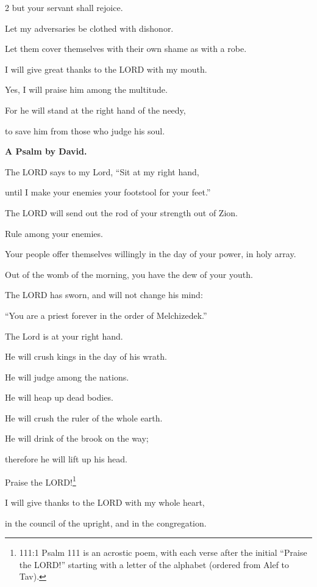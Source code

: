 \begin{multicols}{2}
	but your servant shall rejoice.
	
	
	\myverse{}Let my adversaries be clothed with dishonor.
	
	Let them cover themselves with their own shame as with a robe.
	
	
	\myverse{}I will give great thanks to the LORD with my mouth.
	
	Yes, I will praise him among the multitude.
	
	
	\myverse{}For he will stand at the right hand of the needy,
	
	to save him from those who judge his soul.
	
	
	\mychapter{}\textbf{A Psalm by David.}
	
	\quad\quad\quad\myverse*{}The LORD says to my Lord, “Sit at my right hand,
	
	until I make your enemies your footstool for your feet.”
	
	
	\myverse{}The LORD will send out the rod of your strength out of Zion.
	
	Rule among your enemies.
	
	
	\myverse{}Your people offer themselves willingly in the day of your power,
	in holy array.
	
	Out of the womb of the morning, you have the dew of your youth.
	
	
	\myverse{}The LORD has sworn, and will not change his mind:
	
	“You are a priest forever in the order of Melchizedek.”
	
	
	\myverse{}The Lord is at your right hand.
	
	He will crush kings in the day of his wrath.
	
	
	\myverse{}He will judge among the nations.
	
	He will heap up dead bodies.
	
	He will crush the ruler of the whole earth.
	
	
	\myverse{}He will drink of the brook on the way;
	
	therefore he will lift up his head.
	
	
	\mychapter{} \myverse*{}Praise the LORD!\footnote{111:1 Psalm 111 is an acrostic poem, with each verse after the initial “Praise the LORD!” starting
		with a letter of the alphabet (ordered from Alef to Tav).}
	
	\quad\quad\quad I will give thanks to the LORD with my whole heart,
	
	in the council of the upright, and in the congregation.
	

\end{multicols}
